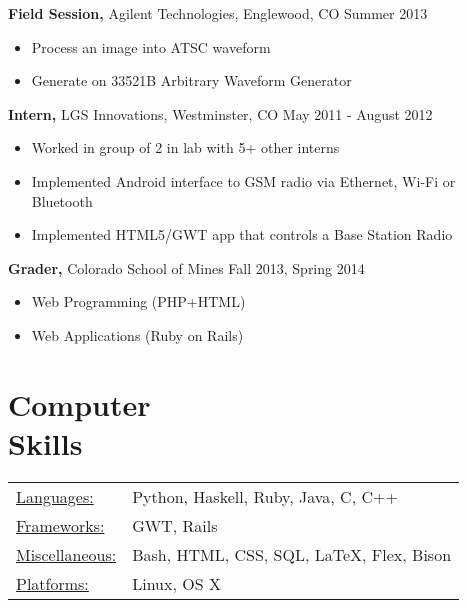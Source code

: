 \documentclass[12pt]{res}
\begin{document}
\begin{resume}
 {\bf Field Session,} Agilent Technologies, Englewood, CO \hfill Summer 2013
 \begin{itemize} \itemsep -2pt
     \item Process an image into ATSC waveform
     \item Generate on 33521B Arbitrary Waveform Generator
 \end{itemize}

 {\bf Intern,} LGS Innovations, Westminster, CO \hfill May 2011 - August 2012
 \begin{itemize} \itemsep -2pt
     \item Worked in group of 2 in lab with 5+ other interns
     \item Implemented Android interface to GSM radio via Ethernet, Wi-Fi or Bluetooth
     \item Implemented HTML5/GWT app that controls a Base Station Radio
 \end{itemize}

 {\bf Grader,} Colorado School of Mines \hfill Fall 2013, Spring 2014
 \begin{itemize} \itemsep -2pt
    \item Web Programming (PHP+HTML)
    \item Web Applications (Ruby on Rails)
 \end{itemize}

\section{Computer \\ Skills}
\begin{tabular}{l p{4in}}
    \underline{Languages:} & Python, Haskell, Ruby, Java, C, C++ \\
    \underline{Frameworks:} & GWT, Rails \\
    \underline{Miscellaneous:} & Bash, HTML, CSS, SQL, \LaTeX, Flex, Bison \\
    \underline{Platforms:} & Linux, OS X
 \end{tabular}

\end{resume}
\end{document}
